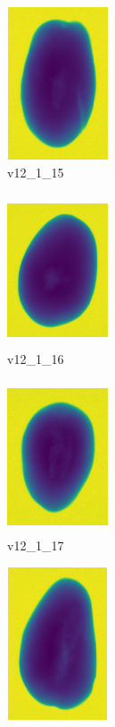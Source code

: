 \documentclass[11pt]{article}
\begin{document}
\begin{figure}
     
    \begin{subfigure}[b]{0.15\textwidth}
         \centering
         \includegraphics[width=3cm, height=4.5cm]{images/kartofler/v12_1_15_cut.png}
         \caption{v12\_1\_15}
         \label{fig:y equals x}
     \end{subfigure}
     \hfill
     \begin{subfigure}[b]{0.15\textwidth}
         \centering
         \includegraphics[width=3cm, height=4.5cm]{images/kartofler/v12_1_16_cut.png}
        \caption{v12\_1\_16}
         \label{fig:three sin x}
     \end{subfigure}
     \hfill
     \begin{subfigure}[b]{0.15\textwidth}
         \centering
         \includegraphics[width=3cm, height=4.5cm]{images/kartofler/v12_1_17_cut.png}
        \caption{v12\_1\_17}
         \label{fig:five over x}
     \end{subfigure}
     \hfill
    \begin{subfigure}[b]{0.15\textwidth}
         \centering
         \includegraphics[width=3cm, height=4.5cm]{images/kartofler/v12_1_18_cut.png}

\end{subfigure}
\end{figure}
\end{document}

